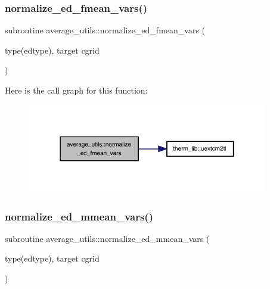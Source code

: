 \subsubsection{\texorpdfstring{normalize\+\_\+ed\+\_\+fmean\+\_\+vars()}{normalize\_ed\_fmean\_vars()}}
{\footnotesize\ttfamily subroutine average\+\_\+utils\+::normalize\+\_\+ed\+\_\+fmean\+\_\+vars (\begin{DoxyParamCaption}\item[{type(edtype), target}]{cgrid }\end{DoxyParamCaption})}

Here is the call graph for this function\+:
\nopagebreak
\begin{figure}[H]
\begin{center}
\leavevmode
\includegraphics[width=298pt]{namespaceaverage__utils_a662a31926be61beb22be003b5ec40343_cgraph}
\end{center}
\end{figure}
\mbox{\label{namespaceaverage__utils_afce18c59b2e9d5605d22e4d356934bdb}} 
\subsubsection{\texorpdfstring{normalize\+\_\+ed\+\_\+mmean\+\_\+vars()}{normalize\_ed\_mmean\_vars()}}
{\footnotesize\ttfamily subroutine average\+\_\+utils\+::normalize\+\_\+ed\+\_\+mmean\+\_\+vars (\begin{DoxyParamCaption}\item[{type(edtype), target}]{cgrid }\end{DoxyParamCaption})}

